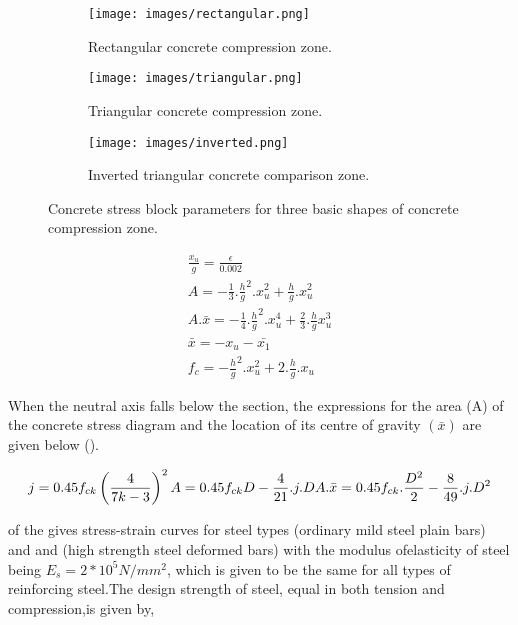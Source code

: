 \begin{figure}
\centering
\begin{subfigure}{0.5\textwidth}
\texttt{[image: images/rectangular.png]}
\caption{Rectangular concrete compression zone.}
\label{fig:rectangular}
\end{subfigure}
%
\begin{subfigure}{0.5\textwidth}
\centering
\texttt{[image: images/triangular.png]}
\caption{Triangular concrete compression zone.}
\label{fig:triangular}
\end{subfigure}
%
\begin{subfigure}{0.5\textwidth}
\centering
\texttt{[image: images/inverted.png]}
\caption{Inverted triangular concrete comparison zone.}
\label{fig:inverted}
\end{subfigure}
\caption{Concrete stress block parameters for three basic shapes of concrete compression zone.}
\label{fig:concrete}
\end{figure}

\begin{align}
\frac{x_u}{g}=\frac{\epsilon}{0.002}\\
A=-\frac{1}{3}.\frac{h}{g}^2.x_u^2+\frac{h}{g}.x_u^2\\
A.\bar{x}=-\frac{1}{4}.\frac{h}{g}^2.x_u^4+\frac{2}{3}.\frac{h}{g}x_u^3\\
\bar{x}=-x_u-\bar{x_1}\\
f_c=-\frac{h}{g}^2.x_u^2+2.\frac{h}{g}.x_u
\end{align}

When the neutral axis falls below the section, the expressions for the
area (A) of the concrete stress diagram and the location of its centre
of gravity $(\bar x)$ are given below ().

\begin{equation}
j=0.45f_{ck}\left(\frac{4}{7k-3}\right)^2\\
A=0.45f_{ck}D-\frac{4}{21}.j.D\\
A.\bar{x}=0.45f_{ck}.\frac{D^2}{2}-\frac{8}{49}.j.D^2
\end{equation}

 of the  gives stress-strain curves for
steel types  (ordinary mild steel plain bars) and {\fefouronefive} and
{\fefivezerozero} (high strength steel deformed bars) with the modulus ofelasticity
of steel being $E_s = 2*10^5 N/mm^2$, which is given to be the same
for all types of reinforcing steel.The design strength of steel, equal
in both tension and compression,is given by,

